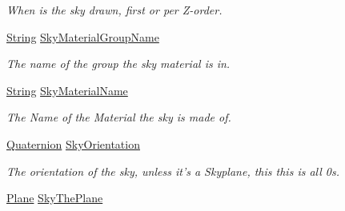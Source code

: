 \begin{DoxyCompactItemize}
\begin{DoxyCompactList}\small\item\em When is the sky drawn, first or per Z-\/order. \item\end{DoxyCompactList}\item 
\hypertarget{classphys_1_1internal_1_1SceneManagerData_a6449ba7dd0d50aa7c121e82982aef54c}{
\hyperlink{namespacephys_aa03900411993de7fbfec4789bc1d392e}{String} \hyperlink{classphys_1_1internal_1_1SceneManagerData_a6449ba7dd0d50aa7c121e82982aef54c}{SkyMaterialGroupName}}
\label{classphys_1_1internal_1_1SceneManagerData_a6449ba7dd0d50aa7c121e82982aef54c}

\begin{DoxyCompactList}\small\item\em The name of the group the sky material is in. \item\end{DoxyCompactList}\item 
\hypertarget{classphys_1_1internal_1_1SceneManagerData_a5a450396db70a6705fc0625aab1fb047}{
\hyperlink{namespacephys_aa03900411993de7fbfec4789bc1d392e}{String} \hyperlink{classphys_1_1internal_1_1SceneManagerData_a5a450396db70a6705fc0625aab1fb047}{SkyMaterialName}}
\label{classphys_1_1internal_1_1SceneManagerData_a5a450396db70a6705fc0625aab1fb047}

\begin{DoxyCompactList}\small\item\em The Name of the Material the sky is made of. \item\end{DoxyCompactList}\item 
\hypertarget{classphys_1_1internal_1_1SceneManagerData_af28e91e743235d1950527bec3071d59a}{
\hyperlink{classphys_1_1Quaternion}{Quaternion} \hyperlink{classphys_1_1internal_1_1SceneManagerData_af28e91e743235d1950527bec3071d59a}{SkyOrientation}}
\label{classphys_1_1internal_1_1SceneManagerData_af28e91e743235d1950527bec3071d59a}

\begin{DoxyCompactList}\small\item\em The orientation of the sky, unless it's a Skyplane, this this is all 0s. \item\end{DoxyCompactList}\item 
\hypertarget{classphys_1_1internal_1_1SceneManagerData_aed226bb4935954873f0d4c7bf8308a43}{
\hyperlink{classphys_1_1Plane}{Plane} \hyperlink{classphys_1_1internal_1_1SceneManagerData_aed226bb4935954873f0d4c7bf8308a43}{SkyThePlane}}
\label{classphys_1_1internal_1_1SceneManagerData_aed226bb4935954873f0d4c7bf8308a43}


\end{DoxyCompactItemize}
